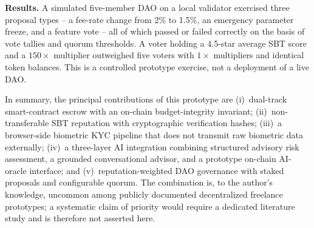 \textbf{Results.} A simulated five-member DAO on a local validator exercised three proposal types -- a fee-rate change from 2\% to 1.5\%, an emergency parameter freeze, and a feature vote -- all of which passed or failed correctly on the basis of vote tallies and quorum thresholds. A voter holding a 4.5-star average SBT score and a $150\times$ multiplier outweighed five voters with $1\times$ multipliers and identical token balances. This is a controlled prototype exercise, not a deployment of a live DAO.

\medskip

In summary, the principal contributions of this prototype are (i)~dual-track smart-contract escrow with an on-chain budget-integrity invariant; (ii)~non-transferable SBT reputation with cryptographic verification hashes; (iii)~a browser-side biometric KYC pipeline that does not transmit raw biometric data externally; (iv)~a three-layer AI integration combining structured advisory risk assessment, a grounded conversational advisor, and a prototype on-chain AI-oracle interface; and (v)~reputation-weighted DAO governance with staked proposals and configurable quorum. The combination is, to the author's knowledge, uncommon among publicly documented decentralized freelance prototypes; a systematic claim of priority would require a dedicated literature study and is therefore not asserted here.
